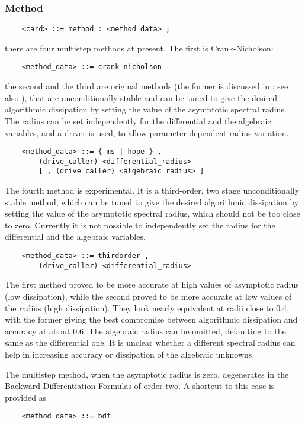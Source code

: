 \subsubsection{Method}
\begin{verbatim}
    <card> ::= method : <method_data> ;
\end{verbatim}
there are four multistep methods at present. 
The first is Crank-Nicholson:
\begin{verbatim}
    <method_data> ::= crank nicholson
\end{verbatim}
the second and the third are original 
methods (the former is discussed in \cite{MASARATI-LANZ-MANTEGAZZA-2001}; 
see also 
), 
that are unconditionally stable and can be tuned to give 
the desired algorithmic dissipation
by setting the value of the asymptotic spectral radius.
The radius can be set independently for the differential
and the algebraic variables, and a driver is used, to allow parameter 
dependent radius variation.
\begin{verbatim}
    <method_data> ::= { ms | hope } ,
        (drive_caller) <differential_radius>
        [ , (drive_caller) <algebraic_radius> ]
\end{verbatim}
The fourth method is experimental. It is a third-order,
two stage unconditionally stable method, which can be tuned to give 
the desired algorithmic dissipation by setting the value 
of the asymptotic spectral radius, which should not be 
too close to zero.
Currently it is not possible to independently set the radius 
for the differential and the algebraic variables.
\begin{verbatim}
    <method_data> ::= thirdorder ,
        (drive_caller) <differential_radius>
\end{verbatim}
The first method proved to be more accurate at high values of asymptotic
radius (low dissipation), while the second proved to be more accurate
at low values of the radius (high dissipation).
They look nearly equivalent at radii close to 0.4, with the former
giving the best compromise between algorithmic dissipation and accuracy 
at about 0.6.
The algebraic radius can be omitted, defaulting to the same 
as the differential one.
It is unclear whether a different spectral radius can help in increasing
accuracy or dissipation of the algebraic unknowns.

\noindent
The multistep method, when the asymptotic radius is zero, degenerates
in the Backward Differentiation Formulas of order two.
A shortcut to this case is provided as
\begin{verbatim}
    <method_data> ::= bdf
\end{verbatim}

